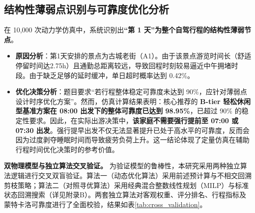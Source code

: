 \documentclass{cumcmthesis}
\begin{document}
\subsection{结构性薄弱点识别与可靠度优化分析}
在 10,000 次动力学仿真中，系统识别出\textbf{“第 1 天”为整个自驾行程的结构性薄弱节点}。
\begin{itemize}
\item \textbf{原因分析}：第1天安排的景点为古城老街（A1）。由于该景点游览时间长（舒适停留时间达2.75h）且通勤总距离较远，导致回程时刻较易逼近中午拥堵时段。由于缺乏足够的延时缓冲，单日超时概率达到 0.42\%。
\item \textbf{优化决策分析}：题目要求“若行程整体稳定可靠度未达到 90\%，应针对薄弱点设计时序优化方案”。然而，仿真计算结果表明：核心推荐的 \textbf{B-tier 轻松休闲型基准方案在 08:00 出发下的整体可靠度已达到 98.95\%}，已超过 90\% 的稳定性要求。因此，在实际出游决策中，\textbf{该家庭不需要强行提前至 07:00 或 07:30 出发}。强行提早出发不仅无法显著提升已处于高水平的可靠度，反而会因为过度剥夺睡眠时间而导致疲劳负荷上升。这一结论体现了定量仿真在辅助行程时间优化决策时的参考价值。
\end{itemize}
\textbf{双物理模型与独立算法交叉验证。} 为验证模型的鲁棒性，本研究采用两种独立算法逻辑进行交叉双盲验证。算法一（动态优化算法）采用前述预计算与不相交回溯剪枝策略；算法二（对照寻优算法）采用经典混合整数线性规划（MILP）与标准状态回溯搜索（详见附录B）。两套独立算法对客观权重、评分排名、行程指标及蒙特卡洛可靠度进行了全面校验，结果如表\ref{tab:cross_validation}。
\end{document}
